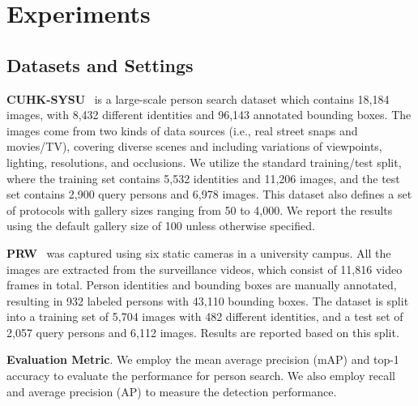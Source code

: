 \documentclass[journal]{IEEEtran}
\begin{document}
\section{Experiments}



\subsection{Datasets and Settings}
\textbf{CUHK-SYSU}~\cite{DBLP:conf/cvpr/XiaoLWLW17} is a large-scale person search dataset which contains 18,184 images, with 8,432 different identities and 96,143 annotated bounding boxes. The images come from two kinds of data sources (i.e., real street snaps and movies/TV),
covering diverse scenes and including variations of viewpoints, lighting, resolutions, and occlusions.
We utilize the standard training/test split, where the training set contains 5,532 identities and 11,206 images, and the test set contains 2,900 query persons and 6,978 images. This dataset also defines a set of protocols with gallery sizes ranging from 50 to 4,000. We report the results using the default gallery size of 100 unless otherwise specified.


\textbf{PRW}~\cite{DBLP:conf/cvpr/ZhengZSCYT17} was captured using six static cameras in a university campus.
All the images are extracted from the surveillance videos, which consist of 11,816 video frames in total. Person identities and bounding boxes are manually annotated, resulting in 932 labeled persons with 43,110 bounding boxes. The dataset is split into a training set of 5,704 images with 482 different identities, and a test set of 2,057 query persons and 6,112 images. Results are reported based on this split.

\textbf{Evaluation Metric}. We employ the mean average precision (mAP) and top-1 accuracy to evaluate the performance for person search. We also employ recall and average precision (AP) to measure the detection performance.
\end{document}
